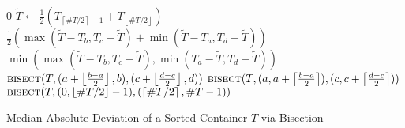 

\begin{algorithm}[h]
\begin{algorithmic}[1]
\State \Return $0$
\EndIf
{}
\State $\widetilde{T} \leftarrow \frac{1}{2}(T_{\left \lceil{\# T /2 }\right \rceil - 1} + T_{\left \lfloor{\# T /2 }\right \rfloor})$
\State \Return $\frac{1}{2} ( \max(\widetilde{T} - T_{b},T_{c} - \widetilde{T} ) + \min(\widetilde{T} - T_{a},T_{d} - \widetilde{T}) )$
\Else
\State \Return $\min(\max(\widetilde{T} - T_{b},T_{c} - \widetilde{T} ),\min(T_{a} - \widetilde{T},T_{d} - \widetilde{T}))$
\EndIf
\EndIf
{}
\State \Return $\Call{bisect}{T,(a+\left \lfloor \frac{b-a}{2}\right \rfloor,b),(c+\left \lfloor \frac{d-c}{2}\right \rfloor,d)}$
\Else
\State \Return $\Call{bisect}{T,(a,a+\left \lceil \frac{b-a}{2}\right \rceil),(c,c+\left \lceil \frac{d-c}{2}\right \rceil)}$
\EndIf
\EndFunction
\State \Return $\Call{bisect}{T,(0,\left \lfloor{\# T /2 }\right \rfloor - 1),(\left \lceil{\# T /2 }\right \rceil,\#T - 1)}$
\EndFunction
\end{algorithmic}
\caption{\label{alg:mad-sorted} Median Absolute Deviation of a Sorted Container $T$ via Bisection}
\end{algorithm}

